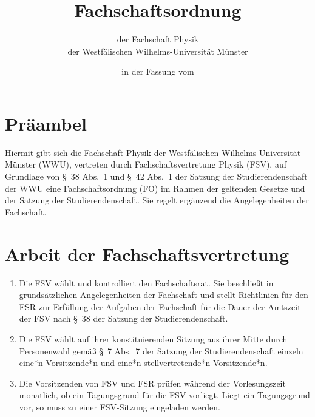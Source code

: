 
\usepackage{pdfpages}


\pagestyle{scrheadings}

\title{Fachschaftsordnung}
\subtitle{der Fachschaft Physik\\
der Westfälischen Wilhelms-Universität Münster}
\date{in der Fassung vom }
\author{}



\maketitle

\section{Präambel}
Hiermit gibt sich die Fachschaft Physik der Westfälischen Wilhelms-Universität Münster (WWU), vertreten durch Fachschaftsvertretung Physik (FSV), auf Grundlage von §~38 Abs.~1 und §~42 Abs.~1 der Satzung der Studierendenschaft der WWU eine Fachschaftsordnung (FO) im Rahmen der geltenden Gesetze und der Satzung der Studierendenschaft.
Sie regelt ergänzend die Angelegenheiten der Fachschaft.

\section{Arbeit der Fachschaftsvertretung}
\begin{enumerate}
	\item Die FSV wählt und kontrolliert den Fachschaftsrat. Sie beschließt in grundsätzlichen Angelegenheiten der Fachschaft und stellt Richtlinien für den FSR zur Erfüllung der Aufgaben der Fachschaft für die Dauer	der Amtszeit der FSV nach §~38 der Satzung der Studierendenschaft.
	\item Die FSV wählt auf ihrer konstituierenden Sitzung aus ihrer Mitte durch Personenwahl gemäß §~7 Abs.~7 der Satzung der Studierendenschaft einzeln eine*n Vorsitzende*n und eine*n stellvertretende*n Vorsitzende*n.
	\item Die Vorsitzenden von FSV und FSR prüfen während der Vorlesungszeit monatlich, ob ein Tagungsgrund für die FSV vorliegt. Liegt ein Tagungsgrund vor, so muss zu einer FSV-Sitzung eingeladen werden.
\end{enumerate}


